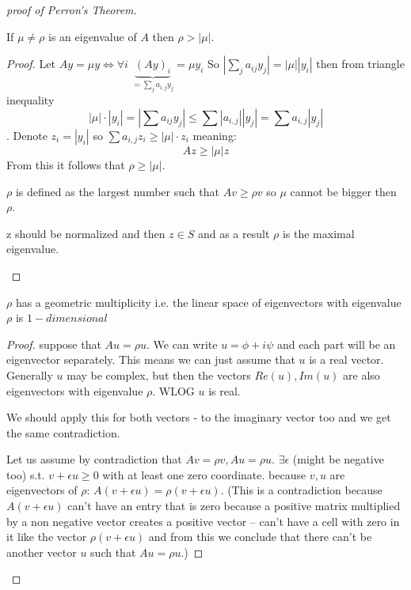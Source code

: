 \begin{proof}[proof of Perron's Theorem]
\begin{claim}
If $\mu\ne\rho$ is an eigenvalue of $A$ then $\rho>\left|\mu\right|$. 
\begin{proof}
Let $Ay=\mu y\iff\forall i\,\,\underbrace{\left(Ay\right)_{i}}_{=\sum\limits _{j}a_{i,j}y_{j}}=\mu y_{i}$
So $\left|\sum\limits _{j}a_{ij}y_{j}\right|=\left|\mu\right|\left|y_{i}\right|$
then from triangle inequality 
\[
\left|\mu\right|\cdot\left|y_{i}\right|=\left|\sum a_{ij}y_{j}\right|\le\sum\left|a_{i,j}\right|\left|y_{j}\right|=\sum a_{i,j}\left|y_{j}\right|
\]
. Denote $z_{i}=\left|y_{i}\right|$ so $\sum a_{i,j}z_{i}\ge\left|\mu\right|\cdot z_{i}$
meaning:
\[
Az\ge\left|\mu\right|z
\]
 From this it follows that $\rho\ge\left|\mu\right|$. %
\begin{insight}
$\rho$ is defined as the largest number such that $Av\ge\rho v$
so $\mu$ cannot be bigger then $\rho$.%
\end{insight}
\begin{insight}
z should be normalized and then $z\in S$ and as a result $\rho$
is the maximal eigenvalue.%
\end{insight}
\end{proof}
\end{claim}

\begin{claim}
$\rho$ has a geometric multiplicity i.e. the linear space of eigenvectors
with eigenvalue $\rho$ is $1-dimensional$
\begin{proof}
suppose that $Au=\rho u$. We can write $u=\phi+i\psi$ and each part
will be an eigenvector separately. This means we can just assume that
$u$ is a real vector. Generally $u$ may be complex, but then the
vectors $Re\left(u\right),Im\left(u\right)$ are also eigenvectors
with eigenvalue $\rho$. WLOG $u$ is real.%
\begin{insight}
We should apply this for both vectors - to the imaginary vector too
and we get the same contradiction.%
\end{insight}

Let us assume by contradiction that $Av=\rho v,Au=\rho u$. $\exists\epsilon$
(might be negative too) s.t. $v+\epsilon u\ge0$ with at least one
zero coordinate. because $v,u$ are eigenvectors of $\rho$: $A\left(v+\epsilon u\right)=\rho\left(v+\epsilon u\right)$.
(This is a contradiction because $A\left(v+\epsilon u\right)$ can't
have an entry that is zero because a positive matrix multiplied by
a non negative vector creates a positive vector -- can't have a cell
with zero in it like the vector $\rho\left(v+\epsilon u\right)$ and
from this we conclude that there can't be another vector $u$ such
that $Au=\rho u$.)


\end{proof}
\end{claim}
\end{proof}
